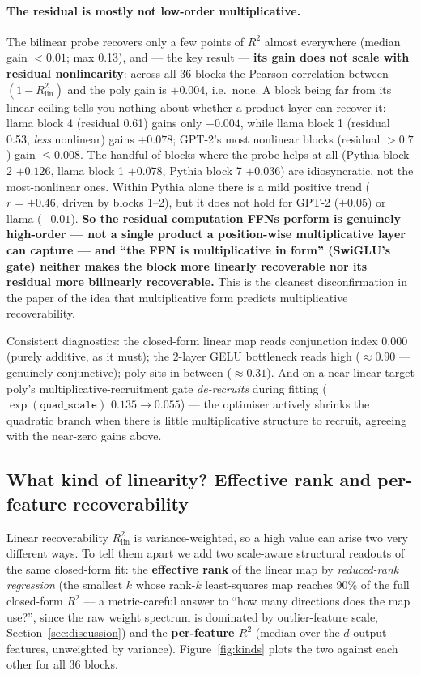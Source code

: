 \documentclass{article}
\newcommand{\Rlin}{R^2_{\mathrm{lin}}}
\begin{document}
\paragraph{The residual is mostly not low-order multiplicative.} The bilinear probe recovers
only a few points of $R^2$ almost everywhere (median gain $< 0.01$; max 0.13), and --- the key
result --- \textbf{its gain does not scale with residual nonlinearity}: across all 36 blocks
the Pearson correlation between $(1-\Rlin)$ and the poly gain is $\mathbf{+0.004}$, i.e.\ none.
A block being far from its linear ceiling tells you nothing about whether a product layer can
recover it: llama block 4 (residual 0.61) gains only $+0.004$, while llama block 1 (residual
0.53, \emph{less} nonlinear) gains $+0.078$; GPT-2's most nonlinear blocks (residual $> 0.7$)
gain $\le 0.008$. The handful of blocks where the probe helps at all (Pythia block 2 $+0.126$,
llama block 1 $+0.078$, Pythia block 7 $+0.036$) are idiosyncratic, not the most-nonlinear
ones. Within Pythia alone there is a mild positive trend ($r = +0.46$, driven by blocks 1--2),
but it does not hold for GPT-2 ($+0.05$) or llama ($-0.01$). \textbf{So the residual
computation FFNs perform is genuinely high-order --- not a single product a position-wise
multiplicative layer can capture --- and ``the FFN is multiplicative in form'' (SwiGLU's gate)
neither makes the block more linearly recoverable nor its residual more bilinearly
recoverable.} This is the cleanest disconfirmation in the paper of the idea that multiplicative
form predicts multiplicative recoverability.

Consistent diagnostics: the closed-form linear map reads conjunction index 0.000 (purely
additive, as it must); the 2-layer GELU bottleneck reads high ($\approx 0.90$ --- genuinely
conjunctive); poly sits in between ($\approx 0.31$). And on a near-linear target poly's
multiplicative-recruitment gate \emph{de-recruits} during fitting ($\exp(\texttt{quad\_scale})$
$0.135 \to 0.055$) --- the optimiser actively shrinks the quadratic branch when there is little
multiplicative structure to recruit, agreeing with the near-zero gains above.

\subsection{What kind of linearity? Effective rank and per-feature recoverability}
\label{sec:kinds}

Linear recoverability $\Rlin$ is variance-weighted, so a high value can arise two very
different ways. To tell them apart we add two scale-aware structural readouts of the same
closed-form fit: the \textbf{effective rank} of the linear map by \emph{reduced-rank
regression} (the smallest $k$ whose rank-$k$ least-squares map reaches 90\% of the full
closed-form $R^2$ --- a metric-careful answer to ``how many directions does the map use?'',
since the raw weight spectrum is dominated by outlier-feature scale, Section~\ref{sec:discussion})
and the \textbf{per-feature $R^2$} (median over the $d$ output features, unweighted by
variance). Figure~\ref{fig:kinds} plots the two against each other for all 36 blocks.
\end{document}
